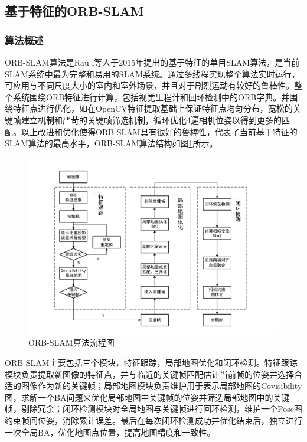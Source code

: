 \subsection{基于特征的ORB-SLAM}

\subsubsection*{算法概述}
ORB-SLAM算法是Ra\'u l等人于2015年提出的基于特征的单目SLAM算法，是当前SLAM系统中最为完整和易用的SLAM系统。通过多线程实现整个算法实时运行，可应用与不同尺度大小的室内和室外场景，并且对于剧烈运动有较好的鲁棒性。整个系统围绕ORB特征\upcite{[3.8]}进行计算，包括视觉里程计和回环检测中的ORB字典\upcite{[3.9]}。并围绕特征点进行优化，如在OpenCV特征提取基础上保证特征点均匀分布，宽松的关键帧建立机制和严苛的关键帧筛选机制，循环优化4遍相机位姿以得到更多的匹配。以上改进和优化使得ORB-SLAM具有很好的鲁棒性，代表了当前基于特征的SLAM算法的最高水平，ORB-SLAM算法结构如图\ref{fig3.6}所示。

\begin{figure}[h]
\centering
\includegraphics[scale=0.5,angle=-90]{figures/Fig3-6.pdf}
\caption{ORB-SLAM算法流程图\upcite{[1.20]}}
\label{fig3.6}
\end{figure}

ORB-SLAM主要包括三个模块，特征跟踪，局部地图优化和闭环检测。特征跟踪模块负责提取新图像的特征点，并与临近的关键帧匹配估计当前帧的位姿并选择合适的图像作为新的关键帧；局部地图模块负责维护用于表示局部地图的Covisibility图，求解一个BA问题来优化局部地图中关键帧的位姿并筛选局部地图中的关键帧，剔除冗余；闭环检测模块对全局地图与关键帧进行回环检测，维护一个Pose图约束帧间位姿，消除累计误差。最后在每次闭环检测成功并优化结束后，独立进行一次全局BA，优化地图点位置，提高地图精度和一致性。


